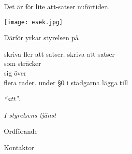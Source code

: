 \documentclass[../main/handlingar.tex]{subfiles}
\begin{document}

Det är för lite att-satser nuförtiden.

\begin{center}
    \texttt{[image: esek.jpg]}
\end{center}

Därför yrkar styrelsen på
\begin{attsatser}
    \att skriva fler att-satser.
    \att
    skriva att-satser\\
    som sträcker\\
    sig över\\
    flera rader.
    \att under \S0 i stadgarna lägga till\par
    \emph{``att''}.
\end{attsatser}

\begin{signatures}{2}
    \emph{I styrelsens tjänst}
    \signature{\ordf}{Ordförande}
    \signature{\sekr}{Kontaktor}
\end{signatures}
\end{document}
